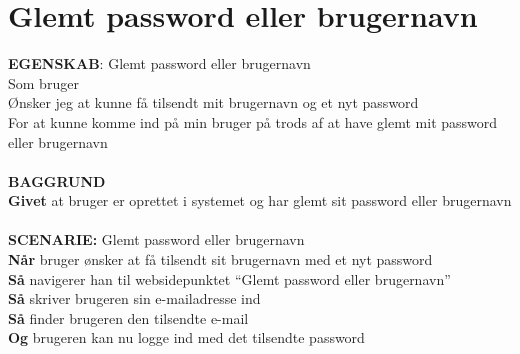 \section{Glemt password eller brugernavn}
{\color{blue}\textbf{EGENSKAB}:} Glemt password eller brugernavn \\
Som bruger \\
Ønsker jeg at kunne få tilsendt mit brugernavn og et nyt password \\
For at kunne komme ind på min bruger på trods af at have glemt mit password eller brugernavn\\ \\
{\color{blue}\textbf{BAGGRUND}} \\
{\color{blue}\textbf{Givet}} at bruger er oprettet i systemet og har glemt sit password eller brugernavn \\
 \\
{\color{blue}\textbf{SCENARIE:}} Glemt password eller brugernavn \\
{\color{blue}\textbf{Når}} bruger ønsker at få tilsendt sit brugernavn med et nyt password \\
{\color{blue}\textbf{Så}} navigerer han til websidepunktet  “Glemt password eller brugernavn” \\
{\color{blue}\textbf{Så}} skriver brugeren sin e-mailadresse ind\\
{\color{blue}\textbf{Så}} finder brugeren den tilsendte e-mail \\
{\color{blue}\textbf{Og}} brugeren kan nu logge ind med det tilsendte password
